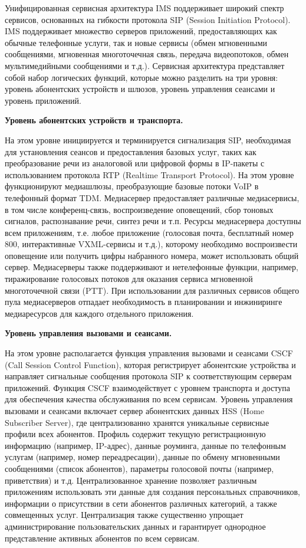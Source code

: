 Унифицированная сервисная архитектура IMS поддерживает широкий спектр сервисов, основанных на гибкости протокола SIP (Session Initiation Protocol). IMS поддерживает множество серверов приложений, предоставляющих как обычные телефонные услуги, так и новые сервисы (обмен мгновенными сообщениями, мгновенная многоточечная связь, передача видеопотоков, обмен мультимедийными сообщениями и т.д.). Сервисная архитектура представляет собой набор логических функций, которые можно разделить на три уровня: уровень абонентских устройств и шлюзов, уровень управления сеансами и уровень приложений.

\textbf{Уровень абонентских устройств и транспорта.}

На этом уровне инициируется и терминируется сигнализация SIP, необходимая для установления сеансов и предоставления базовых услуг, таких как преобразование речи из аналоговой или цифровой формы в IP-пакеты с использованием протокола RTP (Realtime Transport Protocol). На этом уровне функционируют медиашлюзы, преобразующие базовые потоки VoIP в телефонный формат TDM. Медиасервер предоставляет различные медиасервисы, в том числе конференц-связь, воспроизведение оповещений, сбор тоновых сигналов, распознавание речи, синтез речи и т.п. Ресурсы медиасервера доступны всем приложениям, т.е. любое приложение (голосовая почта, бесплатный номер 800, интерактивные VXML-сервисы и т.д.), которому необходимо воспроизвести оповещение или получить цифры набранного номера, может использовать общий сервер. Медиасерверы также поддерживают и нетелефонные функции, например, тиражирование голосовых потоков для оказания сервиса мгновенной многоточечной связи (PTT). При использовании для различных сервисов общего пула медиасерверов отпадает необходимость в планировании и инжиниринге медиаресурсов для каждого отдельного приложения.


\textbf{Уровень управления вызовами и сеансами.}

На этом уровне располагается функция управления вызовами и сеансами CSCF (Call Session Control Function), которая регистрирует абонентские устройства и направляет сигнальные сообщения протокола SIP к соответствующим серверам приложений. Функция CSCF взаимодействует с уровнем транспорта и доступа для обеспечения качества обслуживания по всем сервисам. Уровень управления вызовами и сеансами включает сервер абонентских данных HSS (Home Subscriber Server), где централизованно хранятся уникальные сервисные профили всех абонентов. Профиль содержит текущую регистрационную информацию (например, IP-адрес), данные роуминга, данные по телефонным услугам (например, номер переадресации), данные по обмену мгновенными сообщениями (список абонентов), параметры голосовой почты (например, приветствия) и т.д. Централизованное хранение позволяет различным приложениям использовать эти данные для создания персональных справочников, информации о присутствии в сети абонентов различных категорий, а также совмещенных услуг. Централизация также существенно упрощает администрирование пользовательских данных и гарантирует однородное представление активных абонентов по всем сервисам.

